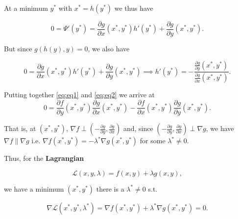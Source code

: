 \documentclass[12pt]{scrartcl}
\begin{document}
At a minimum $y^\ast$ with $x^\ast = h(y^\ast)$ we thus have

\begin{equation}
    \label{eq:eq1}
    0 = \Psi ' (y^\ast) = \frac{\partial g}{\partial x}(x^\ast, y^\ast) h'(y^\ast) + \frac{\partial g}{\partial y}(x^\ast, y^\ast).
\end{equation}

But since $g(h(y), y) = 0$, we also have

\begin{equation}
    \label{eq:eq2}
    0 = \frac{\partial g}{\partial x}(x^\ast, y^\ast) h'(y^\ast) + \frac{\partial g}{\partial y}(x^\ast, y^\ast) 
    \implies h'(y^\ast) = -\frac{\frac{\partial g}{\partial y}(x^\ast, y^\ast)}{\frac{\partial g}{\partial x}(x^\ast, y^\ast)}.
\end{equation}

Putting together \ref{eq:eq1} and \ref{eq:eq2} we arrive at
\begin{equation*}
    0 = \frac{\partial f}{\partial y}(x^\ast, y^\ast) \frac{\partial g}{\partial x}(x^\ast, y^\ast) - \frac{\partial f}{\partial x}(x^\ast, y^\ast) \frac{\partial g}{\partial y}(x^\ast, y^\ast) .
\end{equation*}

That is, at $(x^\ast, y^\ast)$, $\nabla f \perp \left( - \frac{\partial g}{\partial y}, \frac{\partial g}{\partial x}\right) $ and, since 
$\left( - \frac{\partial g}{\partial y}, \frac{\partial g}{\partial x}\right) \perp \nabla g $, we have $\nabla f \| \nabla g$ i.e.
$\nabla f(x^\ast, y^\ast) = - \lambda^\ast \nabla g(x^\ast, y^\ast)$ for some $\lambda^\ast \neq 0$.

\vspace{0.5em}

Thus, for the \textbf{Lagrangian}

\begin{equation*}
    \mathcal{L}(x, y, \lambda) = f(x, y) + \lambda g(x, y),
\end{equation*}

we have a minimum $(x^\ast, y^\ast)$ there is a $\lambda^\ast \neq 0$ s.t.

\begin{equation*}
    \nabla \mathcal{L}(x^\ast, y^\ast, \lambda^\ast) = \nabla f(x^\ast, y^\ast) + \lambda^\ast \nabla g(x^\ast, y^\ast) = 0.
\end{equation*}


\vspace{0.5em}
\end{document}

